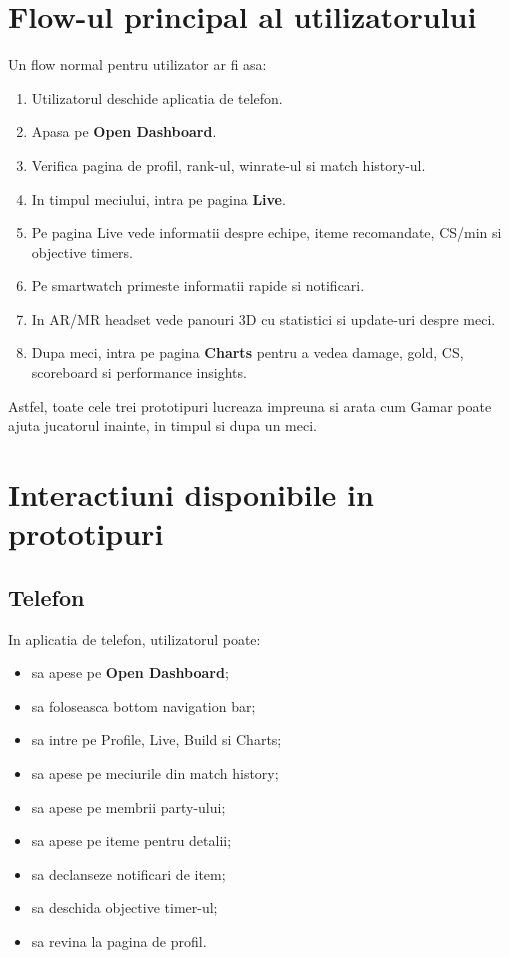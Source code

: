 \documentclass[12pt,a4paper]{article}
\begin{document}
\section{Flow-ul principal al utilizatorului}

Un flow normal pentru utilizator ar fi asa:

\begin{enumerate}
    \item Utilizatorul deschide aplicatia de telefon.
    \item Apasa pe \textbf{Open Dashboard}.
    \item Verifica pagina de profil, rank-ul, winrate-ul si match history-ul.
    \item In timpul meciului, intra pe pagina \textbf{Live}.
    \item Pe pagina Live vede informatii despre echipe, iteme recomandate, CS/min si objective timers.
    \item Pe smartwatch primeste informatii rapide si notificari.
    \item In AR/MR headset vede panouri 3D cu statistici si update-uri despre meci.
    \item Dupa meci, intra pe pagina \textbf{Charts} pentru a vedea damage, gold, CS, scoreboard si performance insights.
\end{enumerate}

Astfel, toate cele trei prototipuri lucreaza impreuna si arata cum Gamar poate ajuta jucatorul inainte, in timpul si dupa un meci.

\section{Interactiuni disponibile in prototipuri}

\subsection{Telefon}

In aplicatia de telefon, utilizatorul poate:

\begin{itemize}
    \item sa apese pe \textbf{Open Dashboard};
    \item sa foloseasca bottom navigation bar;
    \item sa intre pe Profile, Live, Build si Charts;
    \item sa apese pe meciurile din match history;
    \item sa apese pe membrii party-ului;
    \item sa apese pe iteme pentru detalii;
    \item sa declanseze notificari de item;
    \item sa deschida objective timer-ul;
    \item sa revina la pagina de profil.
\end{itemize}
\end{document}
